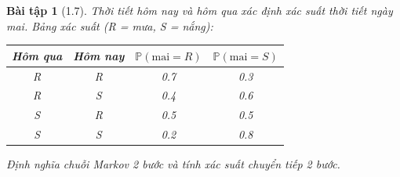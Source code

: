 \documentclass[8pt,a4paper]{article}
\newtheorem{exercise}{Bài tập}
\newcommand{\prob}{\mathbb{P}}
\begin{document}
\begin{exercise}[1.7]
Thời tiết hôm nay và hôm qua xác định xác suất thời tiết ngày mai. Bảng xác suất (R = mưa, S = nắng):
\begin{center}
\begin{tabular}{cc|cc}
Hôm qua & Hôm nay & $\prob(\text{mai} = R)$ & $\prob(\text{mai} = S)$ \\ \hline
R & R & 0.7 & 0.3 \\
R & S & 0.4 & 0.6 \\
S & R & 0.5 & 0.5 \\
S & S & 0.2 & 0.8 \\
\end{tabular}
\end{center}
Định nghĩa chuỗi Markov 2 bước và tính xác suất chuyển tiếp 2 bước.
\end{exercise}
\end{document}
